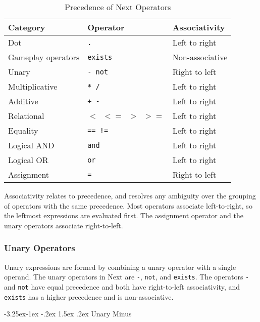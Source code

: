\documentclass[12pt]{article}
\makeatletter
\renewcommand\paragraph{\@startsection{paragraph}{4}{\z@}%
  {-3.25ex\@plus -1ex \@minus -.2ex}%
  {1.5ex \@plus .2ex}%
  {\normalfont\normalsize\bfseries}}
\makeatother
\begin{document}
\begin{table}[htdp]
\caption{Precedence of Next Operators}
\begin{center}
\begin{tabular}{|l|l|l|}
\hline
\textbf{Category} & \textbf{Operator} & \textbf{Associativity} \\
\hline 
Dot & \texttt{.} & Left to right \\
\hline
Gameplay operators & \texttt{exists} & Non-associative \\
\hline
Unary & \texttt{- not} & Right to left \\
\hline
Multiplicative & \texttt{* /} & Left to right \\
\hline
Additive & \texttt{+ -} & Left to right \\
\hline
Relational & \texttt{$<$ $<=$ $>$ $>=$} & Left to right \\
\hline
Equality & \texttt{== !=} & Left to right \\
\hline
Logical AND & \texttt{and} & Left to right \\
\hline
Logical OR & \texttt{or} & Left to right \\
\hline
Assignment & \texttt{=} & Right to left \\
\hline
\end{tabular}
\end{center}
\label{precedence}
\end{table} 

\noindent Associativity relates to precedence, and resolves any ambiguity over the grouping of operators with the same precedence.  Most operators associate left-to-right, so the leftmost expressions are evaluated first.  The assignment operator  and the unary operators associate right-to-left.

\subsubsection{Unary Operators}
Unary expressions are formed by combining a unary operator with a single operand.  The unary operators in Next are \texttt{-}, \texttt{not}, and \texttt{exists}.  The operators \texttt{-} and \texttt{not} have equal precedence and both have right-to-left associativity, and \texttt{exists} has a higher precedence and is non-associative.

\paragraph {Unary Minus} 
\end{document}
